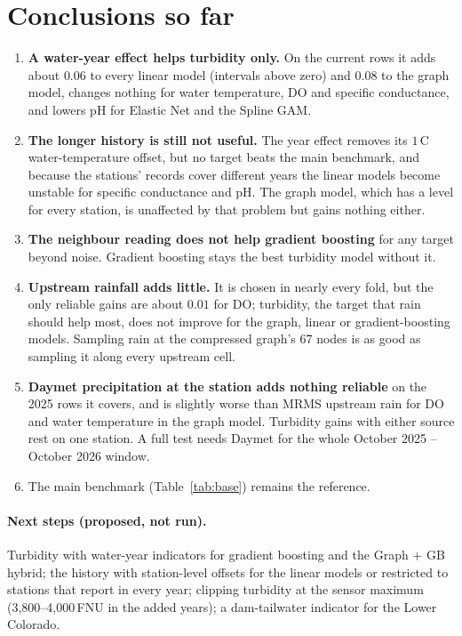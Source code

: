 \documentclass[11pt]{article}
\begin{document}
\section{Conclusions so far}

\begin{enumerate}
  \item \textbf{A water-year effect helps turbidity only.} On the current rows it adds about $0.06$
        to every linear model (intervals above zero) and $0.08$ to the graph model, changes nothing
        for water temperature, DO and specific conductance, and lowers pH for Elastic Net and the
        Spline GAM.
  \item \textbf{The longer history is still not useful.} The year effect removes its
        $1$\,\textdegree C water-temperature offset, but no target beats the main benchmark, and
        because the stations' records cover different years the linear models become unstable for
        specific conductance and pH. The graph model, which has a level for every station, is
        unaffected by that problem but gains nothing either.
  \item \textbf{The neighbour reading does not help gradient boosting} for any target beyond noise.
        Gradient boosting stays the best turbidity model without it.
  \item \textbf{Upstream rainfall adds little.} It is chosen in nearly every fold, but the only
        reliable gains are about $0.01$ for DO; turbidity, the target that rain should help most, does
        not improve for the graph, linear or gradient-boosting models. Sampling rain at the compressed graph's 67 nodes
        is as good as sampling it along every upstream cell.
  \item \textbf{Daymet precipitation at the station adds nothing reliable} on the 2025 rows it
        covers, and is slightly worse than MRMS upstream rain for DO and water temperature in the
        graph model. Turbidity gains with either source rest on one station. A full test needs
        Daymet for the whole October 2025 -- October 2026 window.
  \item The main benchmark (Table~\ref{tab:base}) remains the reference.
\end{enumerate}

\paragraph{Next steps (proposed, not run).} Turbidity with water-year indicators for gradient
boosting and the Graph + GB hybrid; the history with station-level offsets for the linear models or
restricted to stations that report in every year; clipping turbidity at the sensor maximum
(3{,}800--4{,}000\,FNU in the added years); a dam-tailwater indicator for the Lower Colorado.
\end{document}
